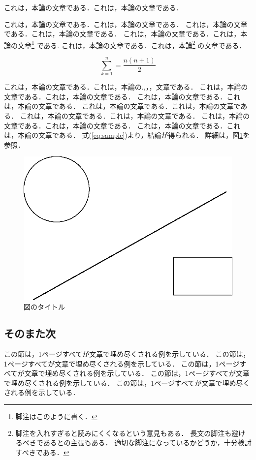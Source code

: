 これは，本論の文章である．これは，本論の文章である．

これは，本論の文章である．これは，本論の文章である．
これは，本論の文章である．これは，本論の文章である．
これは，本論の文章である．これは，本論の文章\footnote{脚注はこのように書く．}
である. 
これは，本論の文章である．これは，本論\footnote{
脚注を入れすぎると読みにくくなるという意見もある．
長文の脚注も避けるべきであるとの主張もある．
適切な脚注になっているかどうか，十分検討すべきである．}
の文章である．

\begin{equation}\label{eq:sample}
 \sum_{k = 1}^{n} = \frac{n(n+1)}{2}
\end{equation}

これは，本論の文章である．これは，本論の.,，，文章である．
これは，本論の文章である．これは，本論の文章である．
これは，本論の文章である．これは，本論の文章である．
これは，本論の文章である．これは，本論の文章である．
これは，本論の文章である．これは，本論の文章である．
これは，本論の文章である．これは，本論の文章である．
これは，本論の文章である．これは，本論の文章である．
式(\ref{eq:sample})より，結論が得られる．
詳細は，図\ref{figure:sample}を参照．

\begin{figure}[!h]
 \begin{center}
  \includegraphics[width=0.5\columnwidth]{figures/fig.eps}
 \end{center}
 \caption{\label{figure:sample}図のタイトル}
\end{figure}

\subsection{そのまた次}

この節は，1ページすべてが文章で埋め尽くされる例を示している．
この節は，1ページすべてが文章で埋め尽くされる例を示している．
この節は，1ページすべてが文章で埋め尽くされる例を示している．
この節は，1ページすべてが文章で埋め尽くされる例を示している．
この節は，1ページすべてが文章で埋め尽くされる例を示している．

